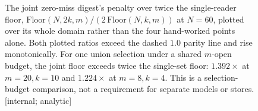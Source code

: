 \begin{figure}[H]
\caption{The joint zero-miss digest's penalty over twice the single-reader
floor, $\mathrm{Floor}(N,2k,m)/(2\,\mathrm{Floor}(N,k,m))$ at $N{=}60$, plotted
over its whole domain rather than the four hand-worked points alone. Both plotted ratios exceed the dashed $1.0$ parity line and rise
monotonically. For one union selection under a shared $m$-open budget, the
joint floor exceeds twice the single-set floor: $1.392\times$ at
$m{=}20,k{=}10$ and $1.224\times$ at $m{=}8,k{=}4$. This is a selection-budget
comparison, not a requirement for separate models or stores. [internal; analytic]}
\label{fig:split-penalty}
\end{figure}

